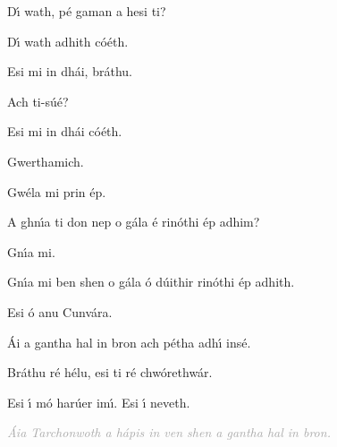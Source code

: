 \begingroup
\fontsize{10pt}{12pt}\selectfont
\begin{leftbubbles}D\'{\i} wath, p\'{e} gaman a hesi ti?\end{leftbubbles}
\begin{rightbubbles}
D\'{\i} wath adhith c\'{o}\'{e}th.

Esi mi in dh\'{a}i, br\'{a}thu.

Ach ti-s\'{u}\'{e}?
\end{rightbubbles}
\begin{leftbubbles}Esi mi in dh\'{a}i c\'{o}\'{e}th.\end{leftbubbles}
\begin{rightbubbles}Gwerthamich.\end{rightbubbles}
\begin{leftbubbles}
Gw\'{e}la mi prin \'{e}p.

A ghn\'{\i}a ti don nep o g\'{a}la \'{e} rin\'{o}thi \'{e}p adhim?
\end{leftbubbles}
\begin{rightbubbles}
Gn\'{\i}a mi.

Gn\'{\i}a mi ben shen o g\'{a}la \'{o} d\'{u}ithir rin\'{o}thi \'{e}p adhith.

Esi \'{o} anu Cunv\'{a}ra.

\'{A}i a gantha hal in bron ach p\'{e}tha adh\'{\i} ins\'{e}.
\end{rightbubbles}
\begin{leftbubbles}Br\'{a}thu r\'{e} h\'{e}lu, esi ti r\'{e} chw\'{o}rethw\'{a}r.\end{leftbubbles}
\begin{rightbubbles}Esi \'{\i} m\'{o} har\'{u}er im\'{\i}. Esi \'{\i} neveth.\end{rightbubbles}
\endgroup

\begin{center}\textcolor{darkgray}{\textit{\'{A}ia Tarchonwoth a h\'{a}pis in ven shen a gantha hal in bron.}}\end{center}

